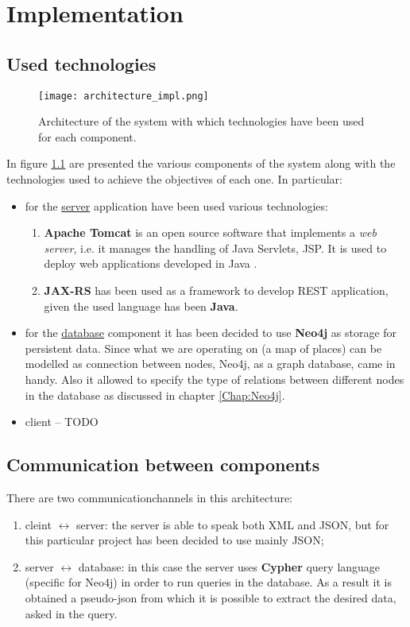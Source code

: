 \chapter{Implementation}\label{Chap:Impl}
\section{Used technologies}
\begin{figure}[!htb]
   \centering
   \texttt{[image: architecture\_impl.png]}
   \caption{Architecture of the system with which technologies have been used for each component.}\label{Fig:ArchImpl}
\end{figure}
In figure \ref{Fig:ArchImpl} are presented the various components of the system along with the technologies used to achieve the objectives of each one. In particular:
\begin{itemize}
  \item for the \underline{server} application have been used various technologies:
    \begin{enumerate}
      \item \textbf{Apache Tomcat} is an open source software that implements a \textit{web server}, i.e. it manages the handling of Java Servlets, JSP. It is used to deploy web applications developed in Java \parencite{tomcat}.
      \item \textbf{JAX-RS} has been used as a framework to develop REST application, given the used language has been \textbf{Java}.
    \end{enumerate}
  \item for the \underline{database} component it has been decided to use \textbf{Neo4j} as
    storage for persistent data. Since what we are operating on (a map of places) can be modelled as connection between nodes, Neo4j, as a graph database, came in handy. Also it allowed to specify the type of relations between different nodes in the database as discussed in chapter \ref{Chap:Neo4j}.
  \item client -- TODO
\end{itemize}


\section{Communication between components}
There are two communicationchannels in this architecture:
\begin{enumerate}
  \item cleint $\leftrightarrow$ server: the server is able to speak both XML and JSON, but for this particular project has been decided to use mainly JSON;
  \item server $\leftrightarrow$ database: in this case the server uses \textbf{Cypher} query language (specific for Neo4j) in order to run queries in the database. As a result it is obtained a pseudo-json from which it is possible to extract the desired data, asked in the query.
\end{enumerate}

